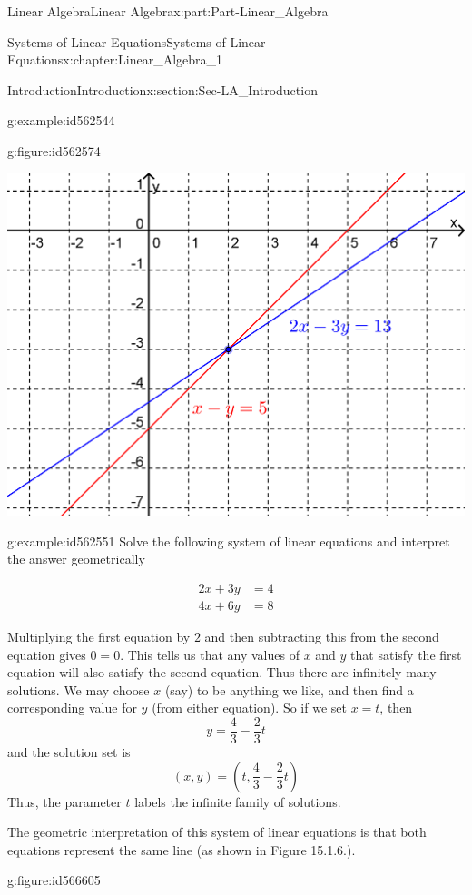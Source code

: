 \documentclass[oneside,10pt,]{book}
\numberwithin{equation}{section}
\newcommand{\amp}{&}
\begin{document}
\begin{partptx}{Linear Algebra}{}{Linear Algebra}{}{}{x:part:Part-Linear_Algebra}
\begin{chapterptx}{Systems of Linear Equations}{}{Systems of Linear Equations}{}{}{x:chapter:Linear_Algebra_1}
\begin{sectionptx}{Introduction}{}{Introduction}{}{}{x:section:Sec-LA_Introduction}
\begin{example}{}{g:example:id562544}
\begin{figureptx}{}{g:figure:id562574}{}
\begin{image}{0.2}{0.6}{0.2}%
\includegraphics[width=\linewidth]{./LinearAlgebra/Images/1/figure1.png}
\end{image}%
\tcblower
\end{figureptx}%
%
\end{example}
\begin{example}{}{g:example:id562551}%
Solve the following system of linear equations and interpret the answer geometrically%
\par
%
\begin{align*}
2x+3y \amp =4\\
4x+6y \amp =8
\end{align*}
%
\par\smallskip%
\noindent\hypertarget{g:solution:id566542}{}Multiplying the first equation by \(2\) and then subtracting this from the second equation gives \(0=0\). This tells us that any values of \(x\) and \(y\) that satisfy the first equation will also satisfy the second equation. Thus there are infinitely many solutions. We may choose \(x\) (say) to be anything we like, and then find a corresponding value for \(y\) (from either equation). So if we set \(x=t\), then%
\begin{equation*}
y=\frac{4}{3}-\frac{2}{3}t
\end{equation*}
and the solution set is%
\begin{equation*}
(x,y)=\left(t,\frac{4}{3}-\frac{2}{3}t\right)
\end{equation*}
Thus, the parameter \(t\) labels the infinite family of solutions.%
\par
The geometric interpretation of this system of linear equations is that both equations represent the same line (as shown in Figure 15.1.6.). \begin{figureptx}{}{g:figure:id566605}{}%

\end{figureptx}
\end{example}
\end{sectionptx}
\end{chapterptx}
\end{partptx}
\end{document}
